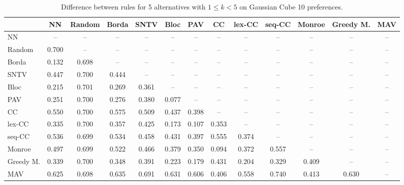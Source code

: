 
\begin{table*}[h!]
\centering
\begin{tabular}{lcccccccccccc}
\toprule
 & NN & Random & Borda & SNTV & Bloc & PAV & CC & lex-CC & seq-CC & Monroe & Greedy M. & MAV \\
\midrule
NN & -- & -- & -- & -- & -- & -- & -- & -- & -- & -- & -- & -- \\
Random & 0.700 & -- & -- & -- & -- & -- & -- & -- & -- & -- & -- & -- \\
Borda & 0.132 & 0.698 & -- & -- & -- & -- & -- & -- & -- & -- & -- & -- \\
SNTV & 0.447 & 0.700 & 0.444 & -- & -- & -- & -- & -- & -- & -- & -- & -- \\
Bloc & 0.215 & 0.701 & 0.269 & 0.361 & -- & -- & -- & -- & -- & -- & -- & -- \\
PAV & 0.251 & 0.700 & 0.276 & 0.380 & 0.077 & -- & -- & -- & -- & -- & -- & -- \\
CC & 0.550 & 0.700 & 0.575 & 0.509 & 0.437 & 0.398 & -- & -- & -- & -- & -- & -- \\
lex-CC & 0.335 & 0.700 & 0.357 & 0.425 & 0.173 & 0.107 & 0.353 & -- & -- & -- & -- & -- \\
seq-CC & 0.536 & 0.699 & 0.534 & 0.458 & 0.431 & 0.397 & 0.555 & 0.374 & -- & -- & -- & -- \\
Monroe & 0.497 & 0.699 & 0.522 & 0.466 & 0.379 & 0.350 & 0.094 & 0.372 & 0.557 & -- & -- & -- \\
Greedy M. & 0.339 & 0.700 & 0.348 & 0.391 & 0.223 & 0.179 & 0.431 & 0.204 & 0.329 & 0.409 & -- & -- \\
MAV & 0.625 & 0.698 & 0.635 & 0.691 & 0.631 & 0.606 & 0.406 & 0.558 & 0.740 & 0.413 & 0.630 & -- \\
\bottomrule
\end{tabular}

\caption{Difference between rules for 5 alternatives with $1 \leq k < 5$ on Gaussian Cube 10 preferences.}
\end{table*}
